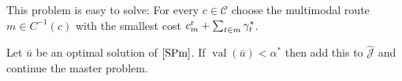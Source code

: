 This problem is easy to solve: For every $c\in\mathcal{C}$ choose the multimodal route $m\in C^{-1}(c)$ with the smallest cost $c^{\operatorname{r}}_m + \sum_{t\in m}\gamma^*_t$. 

Let $\bar{u}$ be an optimal solution of $\eqref{SPm}$. If $\operatorname{val}\left(\bar{u}\right)<\alpha^*$ then add this to $\hat{\mathcal{J}}$ and continue the master problem.